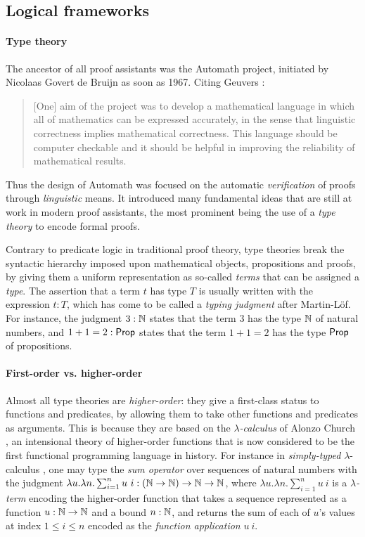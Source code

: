 \subsection{Logical frameworks}

\paragraph{Type theory}

The ancestor of all proof assistants was the Automath project, initiated by
Nicolaas Govert de Bruijn as soon as 1967. Citing Geuvers
:
\begin{quote}
[One] aim of the project was to develop a mathematical language in which all of
mathematics can be expressed accurately, in the sense that linguistic
correctness implies mathematical correctness. This language should be computer
checkable and it should be helpful in improving the reliability of mathematical
results.
\end{quote}
Thus the design of Automath was focused on the automatic \emph{verification} of
proofs through \emph{linguistic} means. It introduced many fundamental ideas
that are still at work in modern proof assistants, the most prominent being the
use of a \emph{type theory} to encode formal proofs.

Contrary to predicate logic in traditional proof theory, type theories break the
syntactic hierarchy imposed upon mathematical objects, propositions and proofs,
by giving them a uniform representation as so-called \emph{terms} that can be
assigned a \emph{type}. The assertion that a term $t$ has type $T$ is usually
written with the expression $t : T$, which has come to be called a \emph{typing
judgment} after Martin-Löf. For instance, the judgment $3 : \mathbb{N}$ states that
the term $3$ has the type $\mathbb{N}$ of natural numbers, and $1 + 1 = 2 : \mathsf{Prop}$
states that the term $1 + 1 = 2$ has the type $\mathsf{Prop}$ of propositions.

\paragraph{First-order vs. higher-order}

Almost all type theories are \emph{higher-order}: they give a first-class status
to functions and predicates, by allowing them to take other functions and
predicates as arguments. This is because they are based on the
\emph{$\lambda$-calculus} of Alonzo Church
, an intensional theory of
higher-order functions that is now considered to be the first functional
programming language in history. For instance in \emph{simply-typed}
$\lambda$-calculus , one may type
the \emph{sum operator} over sequences of natural numbers with the judgment
$\lambda u. \lambda n. \sum_{i = 1}^{n}{u~i} : (\mathbb{N} \to \mathbb{N}) \to \mathbb{N} \to
\mathbb{N}$, where $\lambda u. \lambda n. \sum_{i = 1}^{n}{u~i}$ is a
\emph{$\lambda$-term} encoding the higher-order function that takes a sequence
represented as a function $u : \mathbb{N} \to \mathbb{N}$ and a bound $n : \mathbb{N}$, and
returns the sum of each of $u$'s values at index $1 \leq i \leq n$ encoded as
the \emph{function application} $u~i$.

